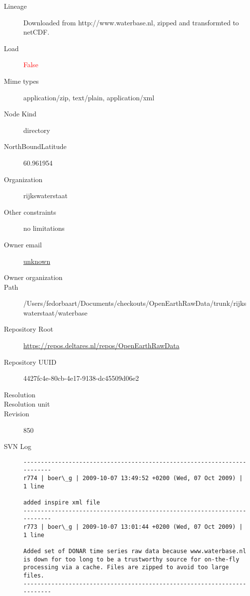 \documentclass[9]{report}
\begin{document}
\begin{description}
  \item[Lineage] Downloaded from http://www.waterbase.nl, zipped and transformted to netCDF.
  \item[Load] \textcolor{red}{False}
  \item[Mime types] application/zip, text/plain, application/xml
  \item[Node Kind] directory
  \item[NorthBoundLatitude] 60.961954
  \item[Organization] rijkswaterstaat
  \item[Other constraints] no limitations
  \item[Owner email] \href{mailto:unknown}{unknown}
  \item[Owner organization] 
  \item[Path] /Users/fedorbaart/Documents/checkouts/OpenEarthRawData/trunk/rijkswaterstaat/waterbase
  \item[Repository Root] \href{https://repos.deltares.nl/repos/OpenEarthRawData}{https://repos.deltares.nl/repos/OpenEarthRawData}
  \item[Repository UUID] 4427fc4e-80cb-4e17-9138-dc45509d06e2
  \item[Resolution] 
  \item[Resolution unit] 
  \item[Revision] 850
  \item[SVN Log] \begin{verbatim}
------------------------------------------------------------------------
r774 | boer\_g | 2009-10-07 13:49:52 +0200 (Wed, 07 Oct 2009) | 1 line

added inspire xml file
------------------------------------------------------------------------
r773 | boer\_g | 2009-10-07 13:01:44 +0200 (Wed, 07 Oct 2009) | 1 line

Added set of DONAR time series raw data because www.waterbase.nl is down for too long to be a trustworthy source for on-the-fly processing via a cache. Files are zipped to avoid too large files.
------------------------------------------------------------------------


\end{verbatim}
\end{description}
\end{document}
